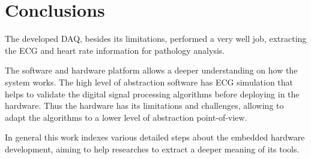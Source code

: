 \section{Conclusions}

The developed DAQ, besides its limitations, performed a very well job, extracting the ECG and heart rate information for pathology analysis.

The software and hardware platform allows a deeper understanding on how the system works. The high level of abstraction software has ECG simulation that helps to validate the digital signal processing algorithms before deploying in the hardware. Thus the hardware has its limitations and challenges, allowing to adapt the algorithms to a lower level of abstraction point-of-view.

In general this work indexes various detailed steps about the embedded hardware development, aiming to help researches to extract a deeper meaning of its tools.

\printbibliography
